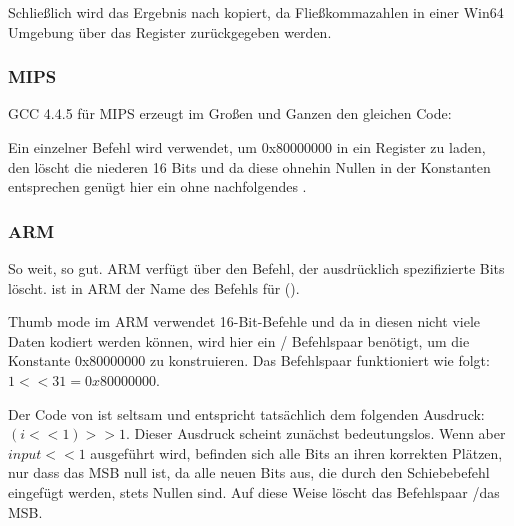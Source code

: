 Schließlich wird das Ergebnis nach  kopiert, da Fließkommazahlen in
einer Win64 Umgebung über das Register  zurückgegeben werden.

\subsubsection{MIPS}

GCC 4.4.5 für MIPS erzeugt im Großen und Ganzen den gleichen Code:



Ein einzelner \LUI Befehl wird verwendet, um 0x80000000 in ein Register zu
laden, den \LUI löscht die niederen 16 Bits und da diese ohnehin Nullen in der
Konstanten entsprechen genügt hier ein \LUI ohne nachfolgendes \ORI.

\subsubsection{ARM}

\myparagraph{\OptimizingKeilVI (\ARMMode)}



So weit, so gut.
ARM verfügt über den \BIC Befehl, der ausdrücklich spezifizierte Bits löscht.
\EOR ist in ARM der Name des Befehls für \XOR ().

\myparagraph{\OptimizingKeilVI (\ThumbMode)}


Thumb mode im ARM verwendet 16-Bit-Befehle und da in diesen nicht viele Daten
kodiert werden können, wird hier ein / Befehlspaar benötigt,
um die Konstante 0x80000000 zu konstruieren. 
Das Befehlspaar funktioniert wie folgt: $1<<31 = 0x80000000$.

Der Code von  ist seltsam und entspricht tatsächlich dem folgenden
Ausdruck: $(i<<1)>>1$. Dieser Ausdruck scheint zunächst bedeutungslos. 
Wenn aber $input<<1$ ausgeführt wird, befinden sich alle Bits an ihren korrekten
Plätzen, nur dass das \ac{MSB} null ist, da alle neuen Bits aus, die durch den
Schiebebefehl eingefügt werden, stets Nullen sind.
Auf diese Weise löscht das Befehlspaar \LSLS/\LSRS das \ac{MSB}.

